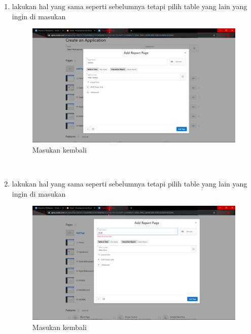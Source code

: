 \begin{enumerate}
\item lakukan hal yang sama seperti sebelumnya tetapi pilih table yang lain yang ingin di masukan
\begin{figure}[H]
    \centering
    \includegraphics[scale=0.2]{figures/24}
    \caption{Masukan kembali}
    \label{Automatic2}
\end{figure} \\

\item lakukan hal yang sama seperti sebelumnya tetapi pilih table yang lain yang ingin di masukan
\begin{figure}[H]
    \centering
    \includegraphics[scale=0.2]{figures/25}
    \caption{Masukan kembali}
    \label{Automatic3}
\end{figure} \\


\end{enumerate}
